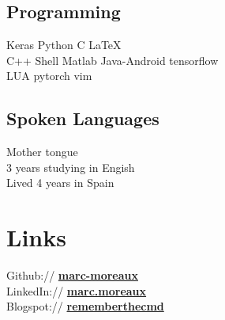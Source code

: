 \documentclass[letterpaper]{deedy-resume} %
\begin{document}
\begin{minipage}[t]{0.33\textwidth}
\sectionspace %
\subsection{Programming}

Keras \textbullet{} Python \textbullet{} C \textbullet{} \LaTeX \\ 
C++ \textbullet{} Shell \textbullet{} Matlab \textbullet{} Java-Android \textbullet{} tensorflow \\
LUA \textbullet{} pytorch \textbullet{} vim \\


\sectionspace %
\subsection{Spoken Languages}

Mother tongue\\
3 years studying in Engish\\
Lived 4 years in Spain

\sectionspace %


\section{Links} 

Github:// \href{https://github.com/marc-moreaux}{\bf marc-moreaux} \\
LinkedIn:// \href{https://fr.linkedin.com/pub/marc-moreaux/4b/760/98b}{\bf marc.moreaux} \\
Blogspot:// \href{http://rememberthecmd.blogspot.fr/}{\bf rememberthecmd}

\sectionspace %



\end{minipage} %
\hfill
%
%
\end{document}
